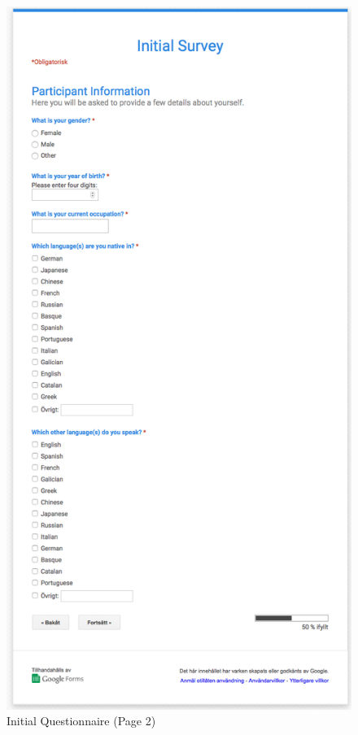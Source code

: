 \begin{figure}[H]
\myfloatalign
\includegraphics[height=\textheight]{img/initial_questionnaire/initial_2.png}
\caption{Initial Questionnaire (Page 2)}
\end{figure}

